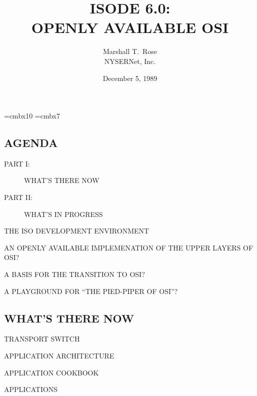 

\font\xx=cmbx10
\font\yy=cmbx7

\raggedright


\let\tradeNAMfont=\relax
\let\tradeORGfont=\relax



\title	{ISODE 6.0:\\ OPENLY AVAILABLE OSI}
\author	{Marshall T.~Rose\\ NYSERNet, Inc.}
\date	{December 5, 1989}
\maketitlepage


\begin{bwslide}
\part*	{AGENDA}\bf

\begin{description}
\item[PART I:]		WHAT'S THERE NOW

\item[PART II:]		WHAT'S IN PROGRESS
\end{description}
\end{bwslide}


\begin{bwslide}

\begin{nrtc}
\item	THE ISO DEVELOPMENT ENVIRONMENT

\item	AN OPENLY AVAILABLE IMPLEMENATION OF THE UPPER LAYERS OF OSI?

\item	A BASIS FOR THE TRANSITION TO OSI?

\item	A PLAYGROUND FOR ``THE PIED-PIPER OF OSI''?
\end{nrtc}
\end{bwslide}


\begin{bwslide}
\part	{WHAT'S THERE NOW}\bf

\begin{nrtc}
\item	TRANSPORT SWITCH

\item	APPLICATION ARCHITECTURE

\item	APPLICATION COOKBOOK

\item	APPLICATIONS
\end{nrtc}
\end{bwslide}


